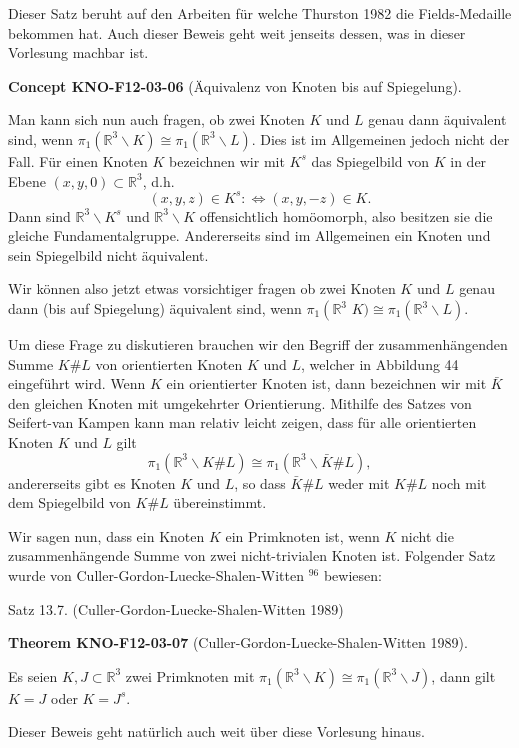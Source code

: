 \documentclass[10pt, letterpaper]{article}
\newcommand{\CustomHeading}[3]{%
  \par\medskip\noindent%
  \textbf{#1 #2} \textnormal{(#3)}.\enskip%
}
\newenvironment{THEO}[2]{\begin{unitbox}\CustomHeading{Theorem}{#1}{#2}}{\end{unitbox}}
\newenvironment{CONC}[2]{\begin{unitbox}\CustomHeading{Concept}{#1}{#2}}{\end{unitbox}}
\begin{document}
Dieser Satz beruht auf den Arbeiten für welche Thurston 1982 die Fields-Medaille bekommen hat. Auch dieser Beweis geht weit jenseits dessen, was in dieser Vorlesung machbar ist.

\begin{CONC}{KNO-F12-03-06}{Äquivalenz von Knoten bis auf Spiegelung}
Man kann sich nun auch fragen, ob zwei Knoten $K$ und $L$ genau dann äquivalent sind, wenn $\pi_1\left(\mathbb{R}^3 \backslash K\right) \cong \pi_1\left(\mathbb{R}^3 \backslash L\right)$. Dies ist im Allgemeinen jedoch nicht der Fall. Für einen Knoten $K$ bezeichnen wir mit $K^s$ das Spiegelbild von $K$ in der Ebene $(x, y, 0) \subset \mathbb{R}^3$, d.h.
$$
(x, y, z) \in K^s: \Leftrightarrow(x, y,-z) \in K .
$$
Dann sind $\mathbb{R}^3 \backslash K^s$ und $\mathbb{R}^3 \backslash K$ offensichtlich homöomorph, also besitzen sie die gleiche Fundamentalgruppe. Andererseits sind im Allgemeinen ein Knoten und sein Spiegelbild nicht äquivalent.

Wir können also jetzt etwas vorsichtiger fragen ob zwei Knoten $K$ und $L$ genau dann (bis auf Spiegelung) äquivalent sind, wenn $\pi_1\left(\mathbb{R}^3 \right.$ $K) \cong \pi_1\left(\mathbb{R}^3 \backslash L\right)$.

Um diese Frage zu diskutieren brauchen wir den Begriff der zusammenhängenden Summe $K \# L$ von orientierten Knoten $K$ und $L$, welcher in Abbildung 44 eingeführt wird. Wenn $K$ ein orientierter Knoten ist, dann bezeichnen wir mit $\bar{K}$ den gleichen Knoten mit umgekehrter Orientierung. Mithilfe des Satzes von Seifert-van Kampen kann man relativ leicht zeigen, dass für alle orientierten Knoten $K$ und $L$ gilt
$$
\pi_1\left(\mathbb{R}^3 \backslash K \# L\right) \cong \pi_1\left(\mathbb{R}^3 \backslash \bar{K} \# L\right),
$$
andererseits gibt es Knoten $K$ und $L$, so dass $\bar{K} \# L$ weder mit $K \# L$ noch mit dem Spiegelbild von $K \# L$ übereinstimmt.

Wir sagen nun, dass ein Knoten $K$ ein Primknoten ist, wenn $K$ nicht die zusammenhängende Summe von zwei nicht-trivialen Knoten ist. Folgender Satz wurde von Culler-Gordon-Luecke-Shalen-Witten ${ }^{96}$ bewiesen:
\end{CONC}

Satz 13.7. (Culler-Gordon-Luecke-Shalen-Witten 1989) 

\begin{THEO}{KNO-F12-03-07}{Culler-Gordon-Luecke-Shalen-Witten 1989}
Es seien $K, J \subset \mathbb{R}^3$ zwei Primknoten mit $\pi_1\left(\mathbb{R}^3 \backslash K\right) \cong \pi_1\left(\mathbb{R}^3 \backslash J\right)$, dann gilt $K=J$ oder $K=J^s$.
\end{THEO}

Dieser Beweis geht natürlich auch weit über diese Vorlesung hinaus.

\pagebreak
\printbibliography
\end{document}
